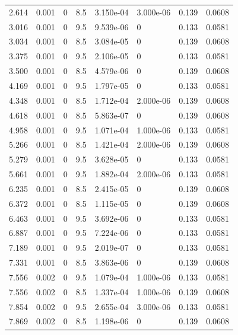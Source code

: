 \documentclass[preview]{standalone}
\begin{document}
{{\begin{tabular}{L{1.2cm}C{1.2cm} C{0.3cm}C{0.5cm} C{1.4cm}C{1.4cm} C{1.4cm}C{1.4cm}}
  2.614  &  0.001  & 0     & 8.5 &  3.150e-04  & 3.000e-06  & 0.139 &  0.0608   \\ 
  3.016  &  0.001  & 0     & 9.5 &  9.539e-06  & 0  & 0.133 &  0.0581   \\ 
  3.034  &  0.001  & 0     & 8.5 &  3.084e-05  & 0  & 0.139 &  0.0608   \\ 
  3.375  &  0.001  & 0     & 9.5 &  2.106e-05  & 0  & 0.133 &  0.0581   \\ 
  3.500  &  0.001  & 0     & 8.5 &  4.579e-06  & 0  & 0.139 &  0.0608   \\ 
  4.169  &  0.001  & 0     & 9.5 &  1.797e-05  & 0  & 0.133 &  0.0581   \\ 
  4.348  &  0.001  & 0     & 8.5 &  1.712e-04  & 2.000e-06  & 0.139 &  0.0608   \\ 
  4.618  &  0.001  & 0     & 8.5 &  5.863e-07  & 0  & 0.139 &  0.0608   \\ 
  4.958  &  0.001  & 0     & 9.5 &  1.071e-04  & 1.000e-06  & 0.133 &  0.0581   \\ 
  5.266  &  0.001  & 0     & 8.5 &  1.421e-04  & 2.000e-06  & 0.139 &  0.0608   \\ 
  5.279  &  0.001  & 0     & 9.5 &  3.628e-05  & 0  & 0.133 &  0.0581   \\ 
  5.661  &  0.001  & 0     & 9.5 &  1.882e-04  & 2.000e-06  & 0.133 &  0.0581   \\ 
  6.235  &  0.001  & 0     & 8.5 &  2.415e-05  & 0  & 0.139 &  0.0608   \\ 
  6.372  &  0.001  & 0     & 8.5 &  1.115e-05  & 0  & 0.139 &  0.0608   \\ 
  6.463  &  0.001  & 0     & 9.5 &  3.692e-06  & 0  & 0.133 &  0.0581   \\ 
  6.887  &  0.001  & 0     & 9.5 &  7.224e-06  & 0  & 0.133 &  0.0581   \\ 
  7.189  &  0.001  & 0     & 9.5 &  2.019e-07  & 0  & 0.133 &  0.0581   \\ 
  7.331  &  0.001  & 0     & 8.5 &  3.863e-06  & 0  & 0.139 &  0.0608   \\ 
  7.556  &  0.002  & 0     & 9.5 &  1.079e-04  & 1.000e-06  & 0.133 &  0.0581   \\ 
  7.556  &  0.002  & 0     & 8.5 &  1.337e-04  & 1.000e-06  & 0.139 &  0.0608   \\ 
  7.854  &  0.002  & 0     & 9.5 &  2.655e-04  & 3.000e-06  & 0.133 &  0.0581   \\ 
  7.869  &  0.002  & 0     & 8.5 &  1.198e-06  & 0  & 0.139 &  0.0608   \\ 

\end{tabular}}}
\end{document}
